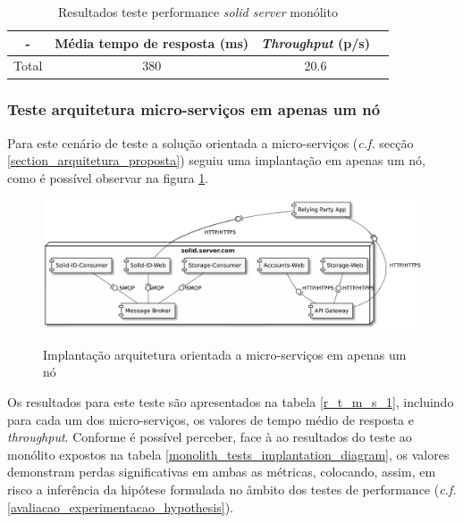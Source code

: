 \begin{table}[h]
\centering

\caption{Resultados teste performance \emph{solid server} monólito}
\vspace{0.5cm}
\begin{tabular}{c|c|c|c}
 - & Média tempo de resposta (ms) & \emph{Throughput} (p/s) \\
\hline                          
Total & 380 & 20.6 \\
\end{tabular}
\end{table}

\subsubsection{Teste arquitetura micro-serviços em apenas um nó \label{tests_micro_services_1}}

Para este cenário de teste a solução orientada a micro-serviços (\emph{c.f.} secção  \ref{section_arquitetura_proposta}) seguiu uma implantação em apenas um nó, como é possível observar na figura \ref{figure_micro_services_tests_1_implantation_diagram}.

\begin{figure}[H]
    \begin{center}
    \label{figure_micro_services_tests_1_implantation_diagram}
    \includegraphics[width=1 \textwidth]{figures/microservices_tests1.eps}
    \caption{Implantação arquitetura orientada a micro-serviços em apenas um nó}
    \end{center}
\end{figure}


Os resultados para este teste são apresentados na tabela \ref{r_t_m_s_1}, incluindo para cada um dos micro-serviços, os valores de tempo médio de resposta e \emph{throughput}.
Conforme é possível perceber, face à ao resultados do teste ao monólito expostos na tabela \ref{monolith_tests_implantation_diagram}, os valores demonstram perdas significativas em ambas as métricas, colocando, assim, em risco a inferência da hipótese formulada no âmbito dos testes de performance (\emph{c.f.} \ref{avaliacao_experimentacao_hypothesis}).


